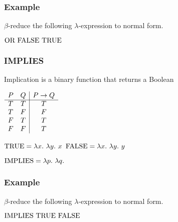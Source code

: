 \documentclass{beamer}
\begin{document}
\begin{frame}
	\frametitle{Example}

	$\beta$-reduce the following $\lambda$-expression to normal form.

	\vspace{0.5cm}

	$\text{OR} \ \text{FALSE} \ \text{TRUE}$

	\vspace{6cm}


\end{frame}

\begin{frame}
	\frametitle{IMPLIES}

	Implication is a binary function that returns a Boolean

	\begin{center}
		$\begin{array}{ c c | c }			
			P & Q & P \to Q\\
			\cline{1 - 3}
			T & T & T \\ 
			T & F & F \\ 
			F & T & T \\ 
			F & F & T
		\end{array}$
	\end{center}

	$\TRUE = \lambda x. \ \lambda y. \ x$ \hspace{4cm} $\FALSE = \lambda x. \ \lambda y. \ y$

	\vspace{0.5cm}

	$\IMP = \lambda p. \ \lambda q. \  $

	\vspace{2cm}
	
\end{frame}

\begin{frame}
	\frametitle{Example}

	$\beta$-reduce the following $\lambda$-expression to normal form.

	\vspace{0.5cm}

	$\text{IMPLIES} \ \text{TRUE} \ \text{FALSE}$

	\vspace{6cm}


\end{frame}
\end{document}
